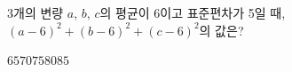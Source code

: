 3개의 변량 $a$, $b$, $c$의 평균이 6이고 표준편차가 5일 때, $(a-6)^2+(b-6)^2+(c-6)^2$의 값은?
\begin{choices32}{$65$}{$70$}{$75$}{$80$}{$85$}\end{choices32}
